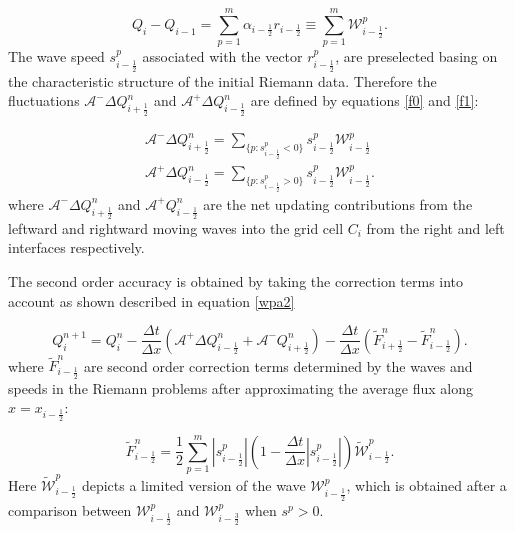 \documentclass[10pt,a4paper]{article}
\begin{document}
	\begin{equation}
		Q_{i} -  Q_{i-1} = \sum_{p=1}^{m}  \alpha_{i-\frac{1}{2}} r_{i-\frac{1}{2}} \equiv \sum_{p=1}^{m} \mathcal{W}_{i-\frac{1}{2}}^{p}.
		\label{wpa19}
	\end{equation}
	The wave speed $s_{i-\frac{1}{2}}^{p}$ associated with the vector $r_{i-\frac{1}{2}}^{p}$, are preselected basing on the characteristic structure of the initial Riemann data. Therefore the fluctuations $\mathcal{A^{-}}\Delta Q_{i+\frac{1}{2}}^{n}$  and $\mathcal{A^{+}}\Delta Q_{i-\frac{1}{2}}^{n} $ are defined by equations \eqref{f0} and \eqref{f1}:
	
	\begin{eqnarray}
		\mathcal{A^{-}}\Delta Q_{i+\frac{1}{2}}^{n} = \sum_{\{ p:s_{i-\frac{1}{2}}^{p}<0\}} s_{i-\frac{1}{2}}^{p} \mathcal{W}_{i-\frac{1}{2}}^{p}
		\label{f0}\\
		\mathcal{A^{+}}\Delta Q_{i-\frac{1}{2}}^{n} =\sum_{\{ p:s_{i-\frac{1}{2}}^{p}>0\}} s_{i-\frac{1}{2}}^{p} \mathcal{W}_{i-\frac{1}{2}}^{p}.
		\label{f1}
	\end{eqnarray}
	where  $\mathcal{A^{-}}\Delta 	Q_{i+\frac{1}{2}}^{n}$ and  $\mathcal{A^{+}}Q_{i-\frac{1}{2}}^{n}$ are the net updating contributions from the  leftward and rightward moving waves into the grid cell $C_{i}$  from the right and left interfaces respectively.
	
	The second order accuracy is obtained by taking the correction terms into account as shown described in equation \eqref{wpa2} 
	
	\begin{equation}
		Q_{i}^{n+1} =  Q_{i}^{n} - \frac{\Delta t}{\Delta x}(\mathcal{A^{+}}\Delta 	Q_{i-\frac{1}{2}}^{n} + \mathcal{A^{-}}Q_{i+\frac{1}{2}}^{n}) -  \frac{\Delta t}{\Delta x} (\tilde{F}_{i+\frac{1}{2}}^{n} - \tilde{F}_{i-\frac{1}{2}}^{n}).
		\label{wpa2}
	\end{equation}
	where $\tilde{F}_{i-\frac{1}{2}}^{n} $ are second order correction terms determined by the waves and speeds in the Riemann problems after approximating the average flux along  $x = x_{i - \frac{1}{2}}$:
	
	\begin{equation}
		\tilde{F}_{i-\frac{1}{2}}^{n} = \frac{1}{2} \sum_{p=1}^{m}  |s_{i- \frac{1}{2}}^{p}| \left( 1 - \frac{\Delta t}{\Delta x} |s_{i- \frac{1}{2}}^{p}|\right) \tilde{\mathcal{W}}_{i-\frac{1}{2}}^{p}.
		\label{wpa13}
	\end{equation}
	Here $\tilde{\mathcal{W}}_{i-\frac{1}{2}}^{p} $ depicts a limited version of the wave $\mathcal{W}_{i-\frac{1}{2}}^{p} $, which is obtained after a comparison between $\mathcal{W}_{i-\frac{1}{2}}^{p} $ and $\mathcal{W}_{i-\frac{3}{2}}^{p} $ when $s^{p} >0$.
	
\end{document}
